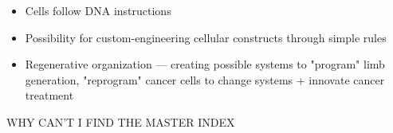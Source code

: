 \documentclass[letterpaper]{article}
\begin{document}
\begin{itemize}
\item Cells follow DNA instructions
\item Possibility for custom-engineering cellular constructs through simple
rules
\item Regenerative organization --- creating possible systems to "program"
limb generation, "reprogram" cancer cells to change systems + innovate
cancer treatment
\end{itemize}

WHY CAN'T I FIND THE MASTER INDEX
\end{document}
